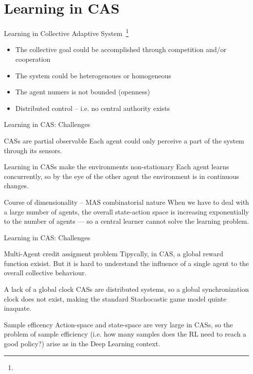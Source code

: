 \documentclass[presentation]{beamer}\mode<presentation>{\usetheme{AMSBolognaFC}}
\begin{document}
\section{Learning in CAS}
\begin{frame}[c]{Learning in Collective Adaptive System~\footnote[frame]{}}
\begin{exampleblock}{}
	\begin{itemize}
		\item The collective goal could be accomplished through competition and/or cooperation 
		\item The system could be heterogenoues or homogeneous
		\item The agent numers is not bounded (openness)
		\item Distributed control -- i.e. no central authority exists
	\end{itemize}
\end{exampleblock}
\end{frame}
\begin{frame}[c]{Learning in CAS: Challenges}
	\begin{exampleblock}{CASs are partial observable}
		Each agent could only perceive a part of the system through its sensors.
	\end{exampleblock}
	\begin{alertblock}{Learning in CASs make the environments non-stationary}
		Each agent learns concurrently, so by the eye of the other agent the environment is in continuous changes.
	\end{alertblock}
	\begin{alertblock}{Course of dimensionality -- MAS combinatorial nature}
		When we have to deal with a large number of agents, the overall state-action space is increasing exponentially to the number of agents --- so a central learner cannot solve the learning problem.
	\end{alertblock}
\end{frame}
\begin{frame}[c]{Learning in CAS: Challenges}
	\begin{exampleblock}{Multi-Agent credit assigment problem}
		Tipycally, in CAS, a global reward function exisist. But it is hard to understand the influence of a single agent to
		the overall collective behaviour.
	\end{exampleblock}
	\begin{exampleblock}{A lack of a global clock}
		CASs are distributed systems, so a global synchronization clock does not exist, making the standard
		Stachocastic game model quinte inaquate.
	\end{exampleblock}
	\begin{exampleblock}{Sample efficency}
		Action-space and state-space are very large in CASs, so the problem of sample efficiency (i.e. how many samples does the RL need to reach a good policy?)
		arise as in the Deep Learning context. 
	\end{exampleblock}
\end{frame}
\end{document}
